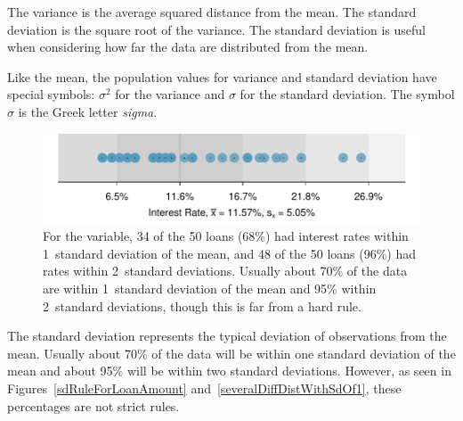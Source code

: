 \begin{termBox}{
  The variance is the average squared distance from the mean.
  The standard deviation is the square root of the variance.
  The standard deviation is useful when considering how far
  the data are distributed from the mean.}
\end{termBox}

Like the mean, the population values for variance
and standard deviation have special symbols:
$\sigma_{}^2$ for the variance and $\sigma$ for the
standard deviation.
The symbol $\sigma$ 
is the Greek letter \emph{sigma}.

\begin{figure}
\centering
\includegraphics[width=\mycaptionwidth]{ch_summarizing_data/figures/sdRuleForIntRate/sdRuleForIntRate}
\caption{For the  variable,
  34 of the 50 loans (68\%) had interest rates within
  1~standard deviation of the mean,
  and 48 of the 50 loans (96\%) had rates within
  2~standard deviations.
  Usually about 70\% of the data are within 1~standard
  deviation of the mean and 95\% within 2~standard
  deviations, though this is far from a hard rule.}
\label{sdRuleForIntRate}
\end{figure}


\begin{termBox}{
  The standard deviation represents the typical deviation
  of observations from the mean.
  Usually about 70\% of the data will be within one standard
  deviation of the mean and about 95\% will be within two
  standard deviations.
  However, as seen in Figures~\ref{sdRuleForLoanAmount}
  and~\ref{severalDiffDistWithSdOf1}, these percentages are
  not strict rules.}
\end{termBox}

